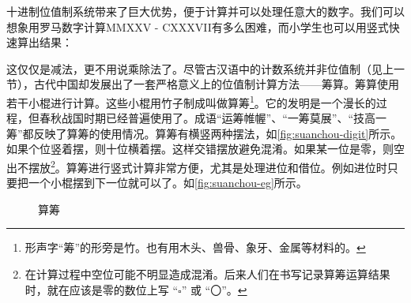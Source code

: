 \documentclass[b5paper]{ctexart}
\begin{document}
十进制位值制系统带来了巨大优势，便于计算并可以处理任意大的数字。我们可以想象用罗马数字计算MMXXV - CXXXVII有多么困难，而小学生也可以用竖式快速算出结果：

\begin{center}
\end{center}

\label{sec:counting-rods} 
这仅仅是减法，更不用说乘除法了。尽管古汉语中的计数系统并非位值制（见上一节），古代中国却发展出了一套严格意义上的位值制计算方法——筹算。筹算使用若干小棍进行计算。这些小棍用竹子制成叫做算筹\footnote{形声字“筹”的形旁是竹。也有用木头、兽骨、象牙、金属等材料的。}。它的发明是一个漫长的过程，但春秋战国时期已经普遍使用了。成语“运筹帷幄”、“一筹莫展”、“技高一筹”都反映了算筹的使用情况。算筹有横竖两种摆法，如\cref{fig:suanchou-digit}所示。如果个位竖着摆，则十位横着摆。这样交错摆放避免混淆。如果某一位是零，则空出不摆放\footnote{在计算过程中空位可能不明显造成混淆。后来人们在书写记录算筹运算结果时，就在应该是零的数位上写 “$\square$” 或 “〇”。}。算筹进行竖式计算非常方便，尤其是处理进位和借位。例如进位时只要把一个小棍摆到下一位就可以了。如\cref{fig:suanchou-eg}所示。

\begin{figure}[htbp]
 \centering
 \caption{算筹}
\end{figure}
\end{document}
